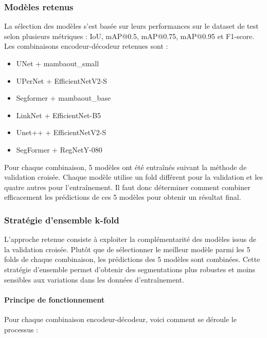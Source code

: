 \subsubsection{Modèles retenus}
La sélection des modèles s'est basée sur leurs performances sur le dataset de test selon plusieurs métriques : IoU, mAP@0.5, mAP@0.75, mAP@0.95 et F1-score. Les combinaisons encodeur-décodeur retenues sont :
\begin{itemize}
    \item UNet + mambaout\_small
    \item UPerNet + EfficientNetV2-S
    \item Segformer + mambaout\_base
    \item LinkNet + EfficientNet-B5
    \item Unet++ + EfficientNetV2-S
    \item SegFormer + RegNetY-080
\end{itemize}

Pour chaque combinaison, 5 modèles ont été entraînés suivant la méthode de validation croisée. Chaque modèle utilise un fold différent pour la validation et les quatre autres pour l'entraînement. Il faut donc déterminer comment combiner efficacement les prédictions de ces 5 modèles pour obtenir un résultat final.

\subsubsection{Stratégie d'ensemble k-fold}

L'approche retenue consiste à exploiter la complémentarité des modèles issus de la validation croisée. Plutôt que de sélectionner le meilleur modèle parmi les 5 folds de chaque combinaison, les prédictions des 5 modèles sont combinées. Cette stratégie d'ensemble permet d'obtenir des segmentations plus robustes et moins sensibles aux variations dans les données d'entraînement.

\paragraph{Principe de fonctionnement}

Pour chaque combinaison encodeur-décodeur, voici comment se déroule le processus :

